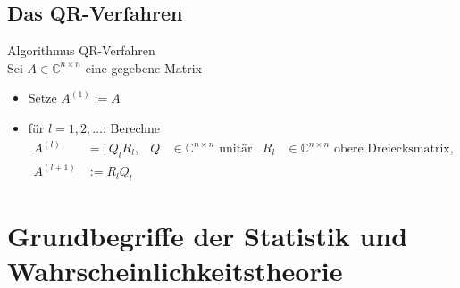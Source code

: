 \documentclass[
	ngerman,
	accentcolor=9c,%
	type=intern,
	marginpar=false
	]{tudapub}
\begin{document}
        \subsection{Das QR-Verfahren}
        \begin{definition}
            Algorithmus QR-Verfahren\\
            Sei $A\in \mathbb{C}^{n \times n}$ eine gegebene Matrix
            \begin{itemize}
                \item Setze $A^{(1)}:= A$
                \item für $l = 1,2, \dots$: Berechne
                \begin{align*}
                    A^{(l)}&=:Q_l R_l, & Q &\in \mathbb{C}^{n \times n} \text{ unitär} & R_l &\in \mathbb{C}^{n \times n} \text{ obere Dreiecksmatrix,}\\
                    A^{(l+1)} &:= R_lQ_l
                \end{align*}
            \end{itemize}
        \end{definition}
    \section{Grundbegriffe der Statistik und Wahrscheinlichkeitstheorie}
\end{document}
